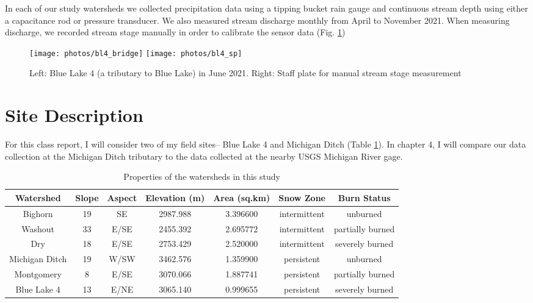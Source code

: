 \documentclass[
]{book}
\begin{document}
In each of our study watersheds we collected precipitation data using a tipping bucket rain gauge and continuous stream depth using either a capacitance rod or pressure transducer. We also measured stream discharge monthly from April to November 2021. When measuring discharge, we recorded stream stage manually in order to calibrate the sensor data (Fig. \ref{fig:pics})

\begin{figure}
\texttt{[image: photos/bl4\_bridge]} \texttt{[image: photos/bl4\_sp]} \caption{Left: Blue Lake 4 (a tributary to Blue Lake) in June 2021. Right: Staff plate for manual stream stage measurement}\label{fig:pics}
\end{figure}

\hypertarget{site-description}{%
\section{Site Description}\label{site-description}}

For this class report, I will consider two of my field sites-- Blue Lake 4 and Michigan Ditch (Table \ref{tab:descr-tab}). In chapter 4, I will compare our data collection at the Michigan Ditch tributary to the data collected at the nearby USGS Michigan River gage.

\begin{table}

\caption{\label{tab:descr-tab}Properties of the watersheds in this study}
\centering
\begin{tabular}[t]{ccccccc}
\toprule
Watershed & Slope & Aspect & Elevation (m) & Area (sq.km) & Snow Zone & Burn Status\\
\midrule
Bighorn & 19 & SE & 2987.988 & 3.396600 & intermittent & unburned\\
Washout & 33 & E/SE & 2455.392 & 2.695772 & intermittent & partially burned\\
Dry & 18 & E/SE & 2753.429 & 2.520000 & intermittent & severely burned\\
Michigan Ditch & 19 & W/SW & 3462.576 & 1.359900 & persistent & unburned\\
Montgomery & 8 & E/SE & 3070.066 & 1.887741 & persistent & partially burned\\
\addlinespace
Blue Lake 4 & 13 & E/NE & 3065.140 & 0.999655 & persistent & severely burned\\
\bottomrule
\end{tabular}
\end{table}
\end{document}
